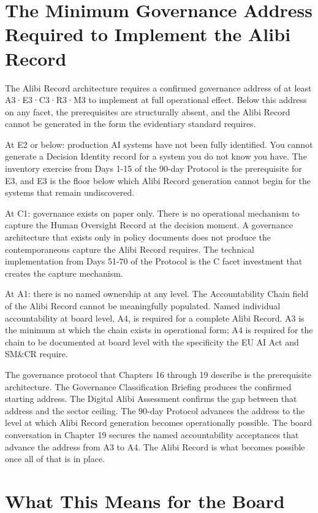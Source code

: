 \section{The Minimum Governance Address Required to Implement the Alibi Record}

The Alibi Record architecture requires a confirmed governance address of at least A3·E3·C3·R3·M3 to implement at full operational effect. Below this address on any facet, the prerequisites are structurally absent, and the Alibi Record cannot be generated in the form the evidentiary standard requires.

At E2 or below: production AI systems have not been fully identified. You cannot generate a Decision Identity record for a system you do not know you have. The inventory exercise from Days 1-15 of the 90-day Protocol is the prerequisite for E3, and E3 is the floor below which Alibi Record generation cannot begin for the systems that remain undiscovered.

At C1: governance exists on paper only. There is no operational mechanism to capture the Human Oversight Record at the decision moment. A governance architecture that exists only in policy documents does not produce the contemporaneous capture the Alibi Record requires. The technical implementation from Days 51-70 of the Protocol is the C facet investment that creates the capture mechanism.

At A1: there is no named ownership at any level. The Accountability Chain field of the Alibi Record cannot be meaningfully populated. Named individual accountability at board level, A4, is required for a complete Alibi Record. A3 is the minimum at which the chain exists in operational form; A4 is required for the chain to be documented at board level with the specificity the EU AI Act and SM\&CR require.

The governance protocol that Chapters 16 through 19 describe is the prerequisite architecture. The Governance Classification Briefing produces the confirmed starting address. The Digital Alibi Assessment confirms the gap between that address and the sector ceiling. The 90-day Protocol advances the address to the level at which Alibi Record generation becomes operationally possible. The board conversation in Chapter 19 secures the named accountability acceptances that advance the address from A3 to A4. The Alibi Record is what becomes possible once all of that is in place.

\scenebreak

\section{What This Means for the Board}

